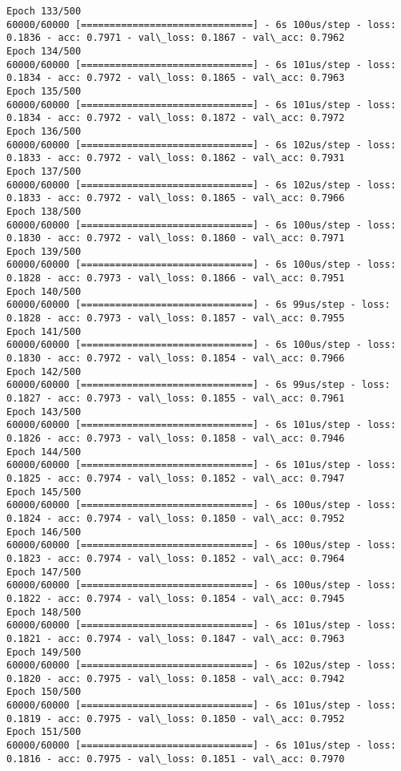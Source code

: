 \documentclass[11pt]{article}
\begin{document}
\begin{Verbatim}[commandchars=\\\{\}]
Epoch 133/500
60000/60000 [==============================] - 6s 100us/step - loss: 0.1836 - acc: 0.7971 - val\_loss: 0.1867 - val\_acc: 0.7962
Epoch 134/500
60000/60000 [==============================] - 6s 101us/step - loss: 0.1834 - acc: 0.7972 - val\_loss: 0.1865 - val\_acc: 0.7963
Epoch 135/500
60000/60000 [==============================] - 6s 101us/step - loss: 0.1834 - acc: 0.7972 - val\_loss: 0.1872 - val\_acc: 0.7972
Epoch 136/500
60000/60000 [==============================] - 6s 102us/step - loss: 0.1833 - acc: 0.7972 - val\_loss: 0.1862 - val\_acc: 0.7931
Epoch 137/500
60000/60000 [==============================] - 6s 102us/step - loss: 0.1833 - acc: 0.7972 - val\_loss: 0.1865 - val\_acc: 0.7966
Epoch 138/500
60000/60000 [==============================] - 6s 100us/step - loss: 0.1830 - acc: 0.7972 - val\_loss: 0.1860 - val\_acc: 0.7971
Epoch 139/500
60000/60000 [==============================] - 6s 100us/step - loss: 0.1828 - acc: 0.7973 - val\_loss: 0.1866 - val\_acc: 0.7951
Epoch 140/500
60000/60000 [==============================] - 6s 99us/step - loss: 0.1828 - acc: 0.7973 - val\_loss: 0.1857 - val\_acc: 0.7955
Epoch 141/500
60000/60000 [==============================] - 6s 100us/step - loss: 0.1830 - acc: 0.7972 - val\_loss: 0.1854 - val\_acc: 0.7966
Epoch 142/500
60000/60000 [==============================] - 6s 99us/step - loss: 0.1827 - acc: 0.7973 - val\_loss: 0.1855 - val\_acc: 0.7961
Epoch 143/500
60000/60000 [==============================] - 6s 101us/step - loss: 0.1826 - acc: 0.7973 - val\_loss: 0.1858 - val\_acc: 0.7946
Epoch 144/500
60000/60000 [==============================] - 6s 101us/step - loss: 0.1825 - acc: 0.7974 - val\_loss: 0.1852 - val\_acc: 0.7947
Epoch 145/500
60000/60000 [==============================] - 6s 100us/step - loss: 0.1824 - acc: 0.7974 - val\_loss: 0.1850 - val\_acc: 0.7952
Epoch 146/500
60000/60000 [==============================] - 6s 100us/step - loss: 0.1823 - acc: 0.7974 - val\_loss: 0.1852 - val\_acc: 0.7964
Epoch 147/500
60000/60000 [==============================] - 6s 100us/step - loss: 0.1822 - acc: 0.7974 - val\_loss: 0.1854 - val\_acc: 0.7945
Epoch 148/500
60000/60000 [==============================] - 6s 101us/step - loss: 0.1821 - acc: 0.7974 - val\_loss: 0.1847 - val\_acc: 0.7963
Epoch 149/500
60000/60000 [==============================] - 6s 102us/step - loss: 0.1820 - acc: 0.7975 - val\_loss: 0.1858 - val\_acc: 0.7942
Epoch 150/500
60000/60000 [==============================] - 6s 101us/step - loss: 0.1819 - acc: 0.7975 - val\_loss: 0.1850 - val\_acc: 0.7952
Epoch 151/500
60000/60000 [==============================] - 6s 101us/step - loss: 0.1816 - acc: 0.7975 - val\_loss: 0.1851 - val\_acc: 0.7970

\end{Verbatim}
\end{document}
